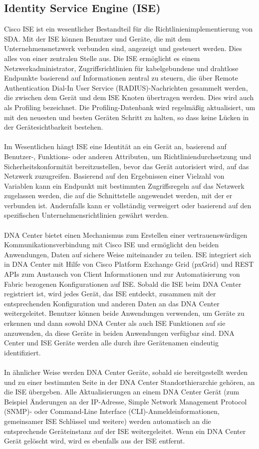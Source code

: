 \subsection{Identity Service Engine (ISE)}
Cisco ISE ist ein wesentlicher Bestandteil für die Richtlinienimplementierung von SDA. Mit der ISE können Benutzer und Geräte, die mit dem Unternehmensnetzwerk verbunden sind, angezeigt und gesteuert werden. Dies alles von einer zentralen Stelle aus. Die ISE ermöglicht es einem Netzwerkadministrator, Zugriffsrichtlinien für kabelgebundene und drahtlose Endpunkte basierend auf Informationen zentral zu steuern, die über Remote Authentication Dial-In User Service (RADIUS)-Nachrichten gesammelt werden, die zwischen dem Gerät und dem ISE Knoten übertragen werden. Dies wird auch als Profiling bezeichnet. Die Profiling-Datenbank wird regelmäßig aktualisiert, um mit den neuesten und besten Geräten Schritt zu halten, so dass keine Lücken in der Gerätesichtbarkeit bestehen. \\
\\
Im Wesentlichen hängt ISE eine Identität an ein Gerät an, basierend auf Benutzer-, Funktions- oder anderen Attributen, um Richtliniendurchsetzung und Sicherheitskonformität bereitzustellen, bevor das Gerät autorisiert wird, auf das Netzwerk zuzugreifen. Basierend auf den Ergebnissen einer Vielzahl von Variablen kann ein Endpunkt mit bestimmten Zugriffsregeln auf das Netzwerk zugelassen werden, die auf die Schnittstelle angewendet werden, mit der er verbunden ist. Andernfalls kann er vollständig verweigert oder basierend auf den spezifischen Unternehmensrichtlinien gewährt werden. \\
\\
DNA Center bietet einen Mechanismus zum Erstellen einer vertrauenswürdigen Kommunikationsverbindung mit Cisco ISE und ermöglicht den beiden Anwendungen, Daten auf sichere Weise miteinander zu teilen. ISE integriert sich in DNA Center mit Hilfe von Cisco Platform Exchange Grid (pxGrid) und REST APIs zum Austausch von Client Informationen und zur Automatisierung von Fabric bezogenen Konfigurationen auf ISE. Sobald die ISE beim DNA Center registriert ist, wird jedes Gerät, das ISE entdeckt, zusammen mit der entsprechenden Konfiguration und anderen Daten an das DNA Center weitergeleitet. Benutzer können beide Anwendungen verwenden, um Geräte zu erkennen und dann sowohl DNA Center als auch ISE Funktionen auf sie anzuwenden, da diese Geräte in beiden Anwendungen verfügbar sind. DNA Center und ISE Geräte werden alle durch ihre Gerätenamen eindeutig identifiziert. \\
\\
In ähnlicher Weise werden DNA Center Geräte, sobald sie bereitgestellt werden und zu einer bestimmten Seite in der DNA Center Standorthierarchie gehören, an die ISE übergeben. Alle Aktualisierungen an einem DNA Center Gerät (zum Beispiel Änderungen an der IP-Adresse, Simple Network Management Protocol (SNMP)- oder Command-Line Interface (CLI)-Anmeldeinformationen, gemeinsamer ISE Schlüssel und weitere) werden automatisch an die entsprechende Geräteinstanz auf der ISE weitergeleitet. Wenn ein DNA Center Gerät gelöscht wird, wird es ebenfalls aus der ISE entfernt. \cite{sda-designguide}

